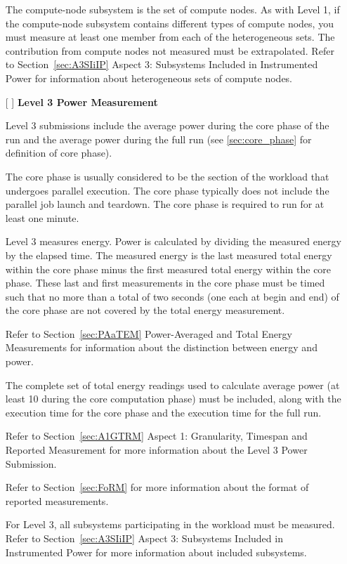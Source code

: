 \begin{itemize}
The compute-node subsystem is the set of compute nodes. As with Level 1, if the compute-node subsystem contains different types of compute nodes, you must measure at least one member from each of the heterogeneous sets. The contribution from compute nodes not measured must be extrapolated. Refer to Section~\ref{sec:A3SIiIP} Aspect 3: Subsystems Included in Instrumented Power for information about heterogeneous sets of compute nodes.

\newpage
\item[{[ ]}]
\textbf{Level 3 Power Measurement}

Level 3 submissions include the average power during the core phase of the run and the average power during the full run (see \ref{sec:core_phase} for definition of core phase).

The core phase is usually considered to be the section of the workload that undergoes parallel execution. The core phase typically does not include the parallel job launch and teardown.
The core phase is required to run for at least one minute.

Level 3 measures energy.
Power is calculated by dividing the measured energy by the elapsed time.
The measured energy is the last measured total energy within the core phase minus the first measured total energy within the core phase.
These last and first measurements in the core phase must be timed such that no more than a total of two seconds (one each at begin and end) of the core phase are not covered by the total energy measurement.

Refer to Section~\ref{sec:PAaTEM} Power-Averaged and Total Energy Measurements for information about the distinction between energy and power.

The complete set of total energy readings used to calculate average power (at least 10 during the core computation phase) must be included, along with the execution time for the core phase and the execution time for the full run.

Refer to Section~\ref{sec:A1GTRM} Aspect 1: Granularity, Timespan and Reported Measurement for more 
information about the Level 3 Power Submission.

Refer to Section~\ref{sec:FoRM} for more information about the format of reported measurements.

For Level 3, all subsystems participating in the workload must be measured. Refer to 
Section~\ref{sec:A3SIiIP} Aspect 3: Subsystems Included in Instrumented Power for more information about included subsystems.


\end{itemize}
